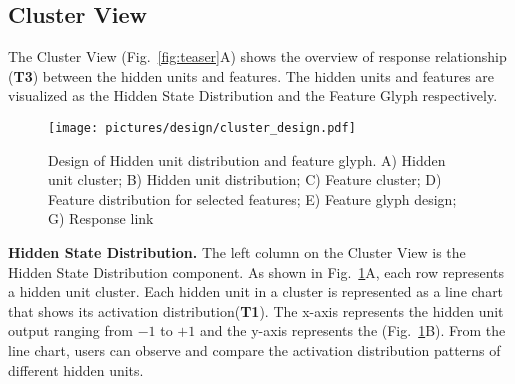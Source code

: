 \subsection{Cluster View}

The Cluster View (Fig.~\ref{fig:teaser}A) shows the overview of response relationship (\textbf{T3}) between the hidden units and features. The hidden units and features are visualized as the Hidden State Distribution and the Feature Glyph respectively.


\begin{figure}[t]
	\centering
    \texttt{[image: pictures/design/cluster\_design.pdf]}
	\vspace{-3mm}
	\caption{Design of Hidden unit distribution and feature glyph. A) Hidden unit cluster; B) Hidden unit distribution; C) Feature cluster; D) Feature distribution for selected features; E) Feature glyph design; G) Response link}
	\label{fig:cluster_design}
	\vspace{-4mm}
\end{figure}


\textbf{Hidden State Distribution.}
The left column on the Cluster View is the Hidden State Distribution component.
As shown in Fig.~\ref{fig:cluster_design}A, each row represents a hidden unit cluster.
Each hidden unit in a cluster is represented as a line chart that shows its activation distribution(\textbf{T1}).
The x-axis represents the hidden unit output ranging from $-1$ to $+1$ and the y-axis represents the  (Fig.~\ref{fig:cluster_design}B).
From the line chart, users can observe and compare the activation distribution patterns of different hidden units. 

